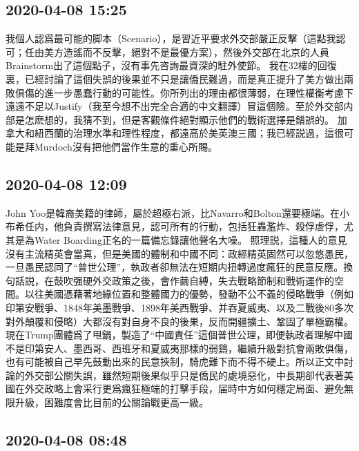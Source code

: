 \documentclass[twocolumn]{ctexart}
\begin{document}
\subsection*{2020-04-08 15:25}

我個人認爲最可能的脚本（Scenario），是習近平要求外交部嚴正反擊（這點我認可；任由美方造謠而不反擊，絕對不是最優方案），然後外交部在北京的人員Brainstorm出了這個點子，沒有事先咨詢最資深的駐外使節。
我在32樓的回復裏，已經討論了這個失誤的後果並不只是讓僑民難過，而是真正提升了美方做出兩敗俱傷的進一步愚蠢行動的可能性。你所列出的理由都很薄弱，在理性權衡考慮下遠遠不足以Justify（我至今想不出完全合適的中文翻譯）冒這個險。至於外交部内部是怎麽想的，我猜不到，但是客觀條件絕對顯示他們的戰術選擇是錯誤的。
加拿大和紐西蘭的治理水準和理性程度，都遠高於美英澳三國；我已經説過，這很可能是拜Murdoch沒有把他們當作生意的重心所賜。
\subsection*{2020-04-08 12:09}

John Yoo是韓裔美籍的律師，屬於超極右派，比Navarro和Bolton還要極端。在小布希任内，他負責撰寫法律意見，認可所有的行動，包括狂轟濫炸、殺俘虐俘，尤其是為Water Boarding正名的一篇備忘錄讓他聲名大噪。
照理説，這種人的意見沒有主流精英會當真，但是美國的體制和中國不同：政經精英固然可以忽悠愚民，一旦愚民認同了“普世公理”，執政者卻無法在短期内扭轉過度瘋狂的民意反應。換句話説，在鼓吹强硬外交政策之後，會作繭自縛，失去戰略節制和戰術運作的空間。以往美國憑藉著地緣位置和整體國力的優勢，發動不公不義的侵略戰爭（例如印第安戰爭、1848年美墨戰爭、1898年美西戰爭、并吞夏威夷、以及二戰後80多次對外顛覆和侵略）大都沒有對自身不良的後果，反而開疆擴土、鞏固了單極霸權。現在Trump團體爲了甩鍋，製造了“中國責任”這個普世公理，即便執政者理解中國不是印第安人、墨西哥、西班牙和夏威夷那樣的弱鷄，繼續升級對抗會兩敗俱傷，也有可能被自己早先鼓動出來的民意挾制，騎虎難下而不得不硬上。所以正文中討論的外交部公關失誤，雖然短期後果似乎只是僑民的處境惡化，中長期卻代表著美國在外交政略上會采行更爲瘋狂極端的打擊手段，届時中方如何穩定局面、避免無限升級，困難度會比目前的公關論戰更高一級。
\subsection*{2020-04-08 08:48}
\end{document}
